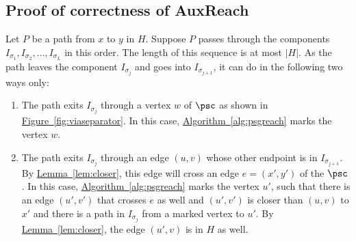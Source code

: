 \documentclass[11pt]{article}
\numberwithin{equation}{section}
\theoremstyle{definition}
\theoremstyle{plain}
\newcommand{\expref}[2]{\hyperref[#2]{#1~\ref{#2}}}
\begin{document}
\subsection{Proof of correctness of \textsf{AuxReach}}

Let $P$ be a path from $x$ to $y$ in $H$. Suppose $P$ passes through the components $I_{\sigma_1}, I_{\sigma_2}, \ldots, I_{\sigma_L}$ in this order. The length of this sequence %
is %
 at most $\lvert H \rvert$. As the path leaves the component $I_{\sigma_j}$ and goes into $I_{\sigma_{j+1}}$, it can do in the following two ways only:
\begin{enumerate}
\item The path exits $I_{\sigma_j}$ through a vertex $w$ of $\psc$ as shown in \expref{Figure}{fig:viaseparator}. In this case, \expref{Algorithm}{alg:psgreach} %
marks  %
the vertex $w$.
\item The path exits $I_{\sigma_j}$ through an edge $(u, v)$ whose other endpoint is in $I_{\sigma_{j+1}}$. By \expref{Lemma}{lem:closer}, this edge will cross an edge $e = (x',y')$ of the $\psc$. In this case, \expref{Algorithm}{alg:psgreach} %
marks  %
the vertex $u'$, such that there is an edge $(u', v')$ that crosses $e$ as well and $(u',v')$ is closer than $(u,v)$ to $x'$ and there is a path in $I_{\sigma_j}$ from a marked vertex to $u'$. By \expref{Lemma}{lem:closer}, the edge $(u', v)$ %
is  %
%
 in $H$ as well.
\end{enumerate}
\end{document}
